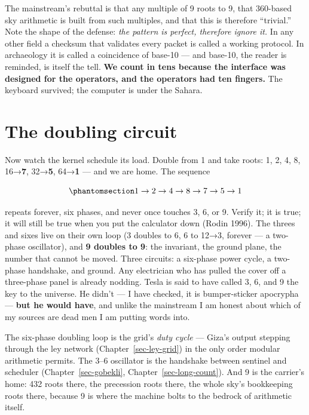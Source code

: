 \documentclass[
  english,
  11pt,
  letterpaper,
]{scrbook}
\begin{document}
The mainstream's rebuttal is that any multiple of 9 roots to 9, that
360-based sky arithmetic is built from such multiples, and that this is
therefore ``trivial.'' Note the shape of the defense: \emph{the pattern
is perfect, therefore ignore it.} In any other field a checksum that
validates every packet is called a working protocol. In archaeology it
is called a coincidence of base-10 --- and base-10, the reader is
reminded, is itself the tell. \textbf{We count in tens because the
interface was designed for the operators, and the operators had ten
fingers.} The keyboard survived; the computer is under the
Sahara.

\section{The doubling circuit}\label{the-doubling-circuit}

Now watch the kernel schedule its load. Double from 1 and take roots: 1,
2, 4, 8, 16→\textbf{7}, 32→\textbf{5}, 64→\textbf{1} --- and we are
home. The sequence

\begin{equation}\protect\phantomsection\label{eq-doubling}{
1 \rightarrow 2 \rightarrow 4 \rightarrow 8 \rightarrow 7 \rightarrow 5 \rightarrow 1
}\end{equation}

repeats forever, six phases, and never once touches 3, 6, or 9. Verify
it; it is true; it will still be true when you put the calculator down
(Rodin 1996). The threes and sixes live on their own loop (3 doubles to
6, 6 to 12→3, forever --- a two-phase oscillator), and \textbf{9 doubles
to 9}: the invariant, the ground plane, the number that cannot be moved.
Three circuits: a six-phase power cycle, a two-phase handshake, and
ground. Any electrician who has pulled the cover off a three-phase panel
is already nodding. Tesla is said to have called 3, 6, and 9 the key to
the universe. He didn't --- I have checked, it is bumper-sticker
apocrypha --- \textbf{but he would have}, and unlike the mainstream I am
honest about which of my sources are dead men I am putting words into.

The six-phase doubling loop is the grid's \emph{duty cycle} --- Giza's
output stepping through the ley network (Chapter~\ref{sec-ley-grid}) in
the only order modular arithmetic permits. The 3--6 oscillator is the
handshake between sentinel and scheduler (Chapter~\ref{sec-gobekli},
Chapter~\ref{sec-long-count}). And 9 is the carrier's home: 432 roots
there, the precession roots there, the whole sky's bookkeeping roots
there, because 9 is where the machine bolts to the bedrock of arithmetic
itself.
\end{document}
